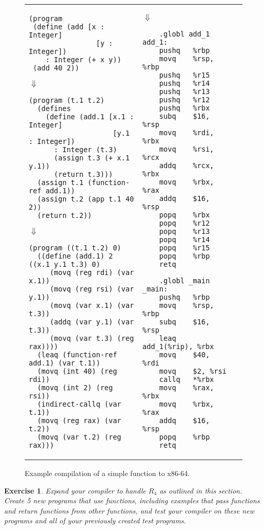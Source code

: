 \documentclass[11pt]{book}
\newtheorem{exercise}[theorem]{Exercise}
\begin{document}
\begin{figure}[tbp]
\begin{tabular}{lll}
\begin{minipage}{0.5\textwidth}
\begin{lstlisting}
(program
 (define (add [x : Integer] 
                [y : Integer]) 
    : Integer (+ x y))
 (add 40 2))
\end{lstlisting}
$\Downarrow$
\begin{lstlisting}
(program (t.1 t.2)
  (defines 
    (define (add.1 [x.1 : Integer] 
                    [y.1 : Integer])
      : Integer (t.3)
      (assign t.3 (+ x.1 y.1))
      (return t.3)))
  (assign t.1 (function-ref add.1))
  (assign t.2 (app t.1 40 2))
  (return t.2))
\end{lstlisting}
$\Downarrow$
\begin{lstlisting}
(program ((t.1 t.2) 0)
  ((define (add.1) 2 ((x.1 y.1 t.3) 0)
     (movq (reg rdi) (var x.1))
     (movq (reg rsi) (var y.1))
     (movq (var x.1) (var t.3))
     (addq (var y.1) (var t.3))
     (movq (var t.3) (reg rax))))
  (leaq (function-ref add.1) (var t.1))
  (movq (int 40) (reg rdi))
  (movq (int 2) (reg rsi))
  (indirect-callq (var t.1))
  (movq (reg rax) (var t.2))
  (movq (var t.2) (reg rax)))
\end{lstlisting}
\end{minipage}
&
\begin{minipage}{0.4\textwidth}
$\Downarrow$
\begin{lstlisting}
	.globl add_1
add_1:
	pushq	%rbp
	movq	%rsp, %rbp
	pushq	%r15
	pushq	%r14
	pushq	%r13
	pushq	%r12
	pushq	%rbx
	subq	$16, %rsp
	movq	%rdi, %rbx
	movq	%rsi, %rcx
	addq	%rcx, %rbx
	movq	%rbx, %rax
	addq	$16, %rsp
	popq	%rbx
	popq	%r12
	popq	%r13
	popq	%r14
	popq	%r15
	popq	%rbp
	retq

	.globl _main
_main:
	pushq	%rbp
	movq	%rsp, %rbp
	subq	$16, %rsp
	leaq	add_1(%rip), %rbx
	movq	$40, %rdi
	movq	$2, %rsi
	callq	*%rbx
	movq	%rax, %rbx
	movq	%rbx, %rax
	addq	$16, %rsp
	popq	%rbp
	retq
\end{lstlisting}
\end{minipage}
\end{tabular} 
\caption{Example compilation of a simple function to x86-64.}
\label{fig:add-fun}
\end{figure}



\begin{exercise}\normalfont
Expand your compiler to handle $R_4$ as outlined in this section.
Create 5 new programs that use functions, including examples that pass
functions and return functions from other functions, and test your
compiler on these new programs and all of your previously created test
programs.
\end{exercise}
\end{document}
